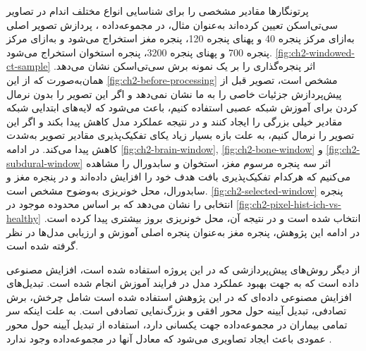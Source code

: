 پرتونگار‌ها مقادیر مشخصی را برای شناسایی انواع مختلف اندام در تصاویر سی‌تی‌اسکن تعیین کرده‌اند به‌عنوان مثال، در مجموعه‌داده
،
پردازش تصویر اصلی به‌ازای مرکز پنجره 40 و پهنای پنجره 120، پنجره مغز استخراج می‌شود و به‌ازای مرکز پنجره 700 و پهنای پنجره 3200،‌ پنجره استخوان استخراج می‌شود.
\autoref{fig:ch2-windowed-ct-sample}
اثر پنجره‌گذاری را بر یک نمونه برش سی‌تی‌اسکن نشان می‌دهد. همان‌به‌صورت که از این
\autoref{fig:ch2-before-processing}
 مشخص است، تصویر قبل از پیش‌پردازش جزئیات خاصی را به ما نشان نمی‌دهد و اگر این تصویر را بدون نرمال کردن برای آموزش شبکه‌ عصبی استفاده کنیم، باعث می‌شود که لایه‌های ابتدایی شبکه مقادیر خیلی بزرگی را ایجاد کنند و در نتیجه عملکرد مدل کاهش پیدا بکند و اگر این تصویر را نرمال کنیم، به علت بازه بسیار زیاد یکای 
تفکیک‌پذیری مقادیر تصویر به‌شدت کاهش پیدا می‌کند. در ادامه
\autoref{fig:ch2-brain-window}, \autoref{fig:ch2-bone-window} و \autoref{fig:ch2-subdural-window}
اثر سه پنجره مرسوم مغز، استخوان و سابدورال را مشاهده می‌کنیم که هرکدام تفکیک‌پذیری بافت هدف خود را افزایش داده‌اند و در پنجره مغز و سابدورال، محل خونریزی به‌وضوح مشخص است.
\autoref{fig:ch2-selected-window}
 پنجره انتخابی را نشان می‌دهد که بر اساس محدوده موجود در  
\autoref{fig:ch2-pixel-hist-ich-vs-healthy}
انتخاب شده ‌است و در نتیجه آن، محل خونریزی بروز بیشتری پیدا کرده است. در ادامه این پژوهش،‌ پنجره مغز به‌عنوان پنجره اصلی آموزش و ارزیابی مدل‌ها در نظر گرفته شده است.

از دیگر روش‌های پیش‌پردازشی که در این پروژه استفاده شده است، افزایش مصنوعی داده است که به جهت بهبود عملکرد مدل در فرایند آموزش انجام شده است. تبدیل‌های افزایش مصنوعی داده‌ای که در این پژوهش استفاده شده است شامل چرخش، برش تصادفی،‌ تبدیل آیینه حول محور افقی و‌ بزرگ‌نمایی تصادفی است. به علت اینکه سر تمامی بیماران در مجموعه‌داده 
جهت یکسانی دارد، استفاده از تبدیل آیینه حول محور عمودی باعث ایجاد تصاویری می‌شود که معادل آنها در مجموعه‌داده وجود ندارد
\cite{hssayeni2020intracranial}.



